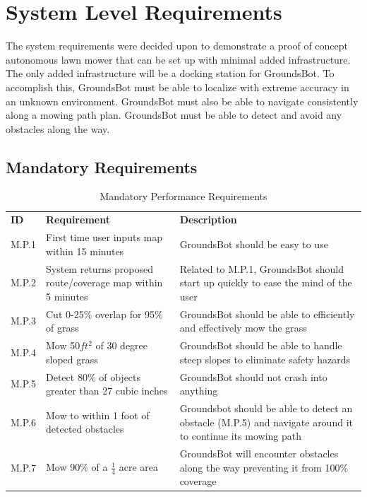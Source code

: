 \documentclass[12pt]{extarticle}
\begin{document}
\newpage
\section{System Level Requirements}

The system requirements were decided upon to demonstrate a proof of concept autonomous lawn mower that can be set up with minimal added infrastructure. The only added infrastructure will be a docking station for GroundsBot. To accomplish this, GroundsBot must be able to localize with extreme accuracy in an unknown environment. GroundsBot must also be able to navigate consistently along a mowing path plan. GroundsBot must be able to detect and avoid any obstacles along the way.

\subsection{Mandatory Requirements}
\begin{center}
  \begin{table}[H]
  \caption*{\sffamily\fontsize{12}{14}\selectfont 
  Mandatory Performance Requirements}
  \label{table:mandatory performance}
  
  \vspace{1em}

  \def\arraystretch{1.5}
  	\begin{tabularx}{\textwidth}{ lXX }
  	  	\hline
		\textbf{ID} & \textbf{Requirement} & \textbf{Description} \\
    	M.P.1 &
    	First time user inputs map within 15 minutes &
    	GroundsBot should be easy to use \\
   		M.P.2 &
   		System returns proposed route/coverage map within 5 minutes &
   		Related to M.P.1, GroundsBot should start up quickly to ease the mind of the user \\
   		M.P.3 &
   		Cut 0-25\% overlap for 95\% of grass &
   		GroundsBot should be able to efficiently and effectively mow the grass \\
		M.P.4 &
		Mow 50$ft^2$ of 30 degree sloped grass &
		GroundsBot should be able to handle steep slopes to eliminate safety hazards \\
		M.P.5 &
		Detect 80\% of objects greater than 27 cubic inches &
		GroundsBot should not crash into anything \\
		M.P.6 &
		Mow to within 1 foot of detected obstacles &
		Groundsbot should be able to detect an obstacle (M.P.5) and navigate around it to continue its mowing path \\
		M.P.7 &
		Mow 90\% of a $\frac{1}{4}$ acre area &
		GroundsBot will encounter obstacles along the way preventing it from 100\% coverage \\
	\end{tabularx}
  \end{table}
\end{center}
\end{document}
